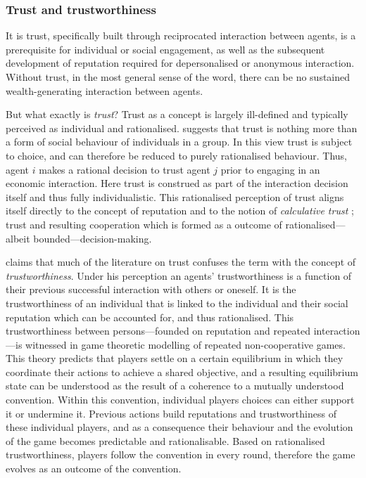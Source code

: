 \begin{subappendices}
\subsubsection{Trust and trustworthiness}

It is trust, specifically built through reciprocated interaction between agents, is a prerequisite for individual or social engagement, as well as the subsequent development of reputation required for depersonalised or anonymous interaction. Without trust, in the most general sense of the word, there can be no sustained wealth-generating interaction between agents. 

But what exactly is \emph{trust}? Trust as a concept is largely ill-defined and typically perceived as individual and rationalised. \citet{Coleman1990} suggests that trust is nothing more than a form of social behaviour of individuals in a group. In this view trust is subject to choice, and can therefore be reduced to purely rationalised behaviour. Thus, agent $i$ makes a rational decision to trust agent $j$ prior to engaging in an economic interaction. Here trust is construed as part of the interaction decision itself and thus fully individualistic. This rationalised perception of trust aligns itself directly to the concept of reputation and to the notion of \textit{calculative trust} \citep{Williamson1993}; trust and resulting cooperation which is formed as a outcome of rationalised---albeit bounded---decision-making.

\citet{Hardin2006} claims that much of the literature on trust confuses the term with the concept of \textit{trustworthiness}. Under his perception an agents' trustworthiness is a function of their previous successful interaction with others or oneself. It is the trustworthiness of an individual that is linked to the individual and their social reputation which can be accounted for, and thus rationalised. This trustworthiness between persons---founded on reputation and repeated interaction---is witnessed in game theoretic modelling of repeated non-cooperative games. This theory predicts that players settle on a certain equilibrium in which they coordinate their actions to achieve a shared objective, and a resulting equilibrium state can be understood as the result of a coherence to a mutually understood convention. Within this convention, individual players choices can either support it or undermine it. Previous actions build reputations and trustworthiness of these individual players, and as a consequence their behaviour and the evolution of the game becomes predictable and rationalisable. Based on rationalised trustworthiness, players follow the convention in every round, therefore the game evolves as an outcome of the convention.


\end{subappendices}
